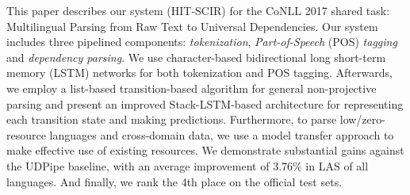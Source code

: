 This paper describes our system (HIT-SCIR) for the CoNLL 2017 shared task: Multilingual Parsing from Raw Text to Universal Dependencies. Our system includes three pipelined components: \textit{tokenization}, \textit{Part-of-Speech} (POS) \textit{tagging} and \textit{dependency parsing}. We use character-based bidirectional long short-term memory (LSTM) networks for both tokenization and POS tagging. Afterwards, we employ a list-based transition-based algorithm for general non-projective parsing and present an improved Stack-LSTM-based architecture for representing each transition state and making predictions. Furthermore, to parse low/zero-resource languages and cross-domain data, we use a model transfer approach to make effective use of existing resources. We demonstrate substantial gains against the UDPipe baseline, with an average improvement of 3.76\% in LAS of all languages. And finally, we rank the 4th place on the official test sets.

